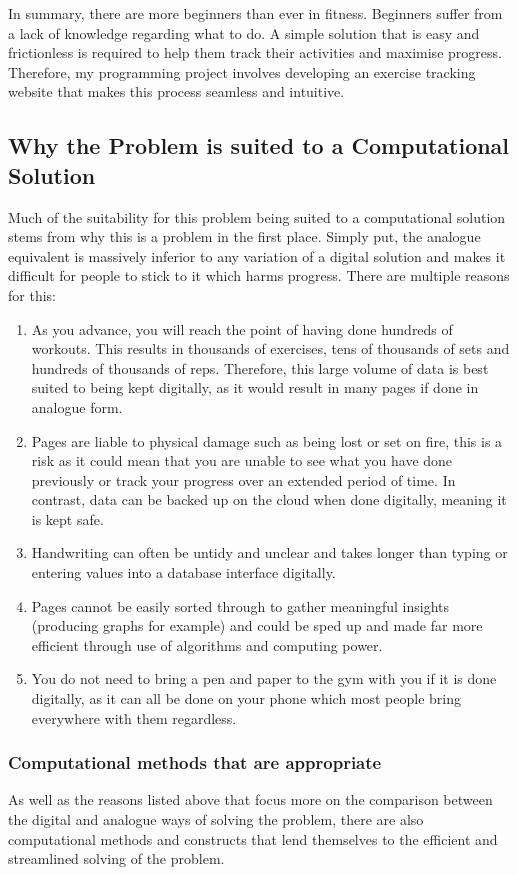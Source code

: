 \documentclass{article}
\begin{document}
In summary, there are more beginners than ever in fitness. Beginners suffer from a lack of knowledge regarding what to do. A simple solution that is easy and frictionless is required to help them track their activities and maximise progress. Therefore, my programming project involves developing an exercise tracking website that makes this process seamless and intuitive. 

\subsection{Why the Problem is suited to a Computational Solution}
Much of the suitability for this problem being suited to a computational solution stems from why this is a problem in the first place. Simply put, the analogue equivalent is massively inferior to any variation of a digital solution and makes it difficult for people to stick to it which harms progress. There are multiple reasons for this:
\begin{enumerate}
  \item As you advance, you will reach the point of having done hundreds of workouts. This results in thousands of exercises, tens of thousands of sets and hundreds of thousands of reps. Therefore, this large volume of data is best suited to being kept digitally, as it would result in many pages if done in analogue form.
  \item Pages are liable to physical damage such as being lost or set on fire, this is a risk as it could mean that you are unable to see what you have done previously or track your progress over an extended period of time. In contrast, data can be backed up on the cloud when done digitally, meaning it is kept safe.
  \item Handwriting can often be untidy and unclear and takes longer than typing or entering values into a database interface digitally. 
  \item Pages cannot be easily sorted through to gather meaningful insights (producing graphs for example) and could be sped up and made far more efficient through use of algorithms and computing power. 
  \item You do not need to bring a pen and paper to the gym with you if it is done digitally, as it can all be done on your phone which most people bring everywhere with them regardless. 
\end{enumerate}
\subsubsection{Computational methods that are appropriate}
As well as the reasons listed above that focus more on the comparison between the digital and analogue ways of solving the problem, there are also computational methods and constructs that lend themselves to the efficient and streamlined solving of the problem.
\end{document}
